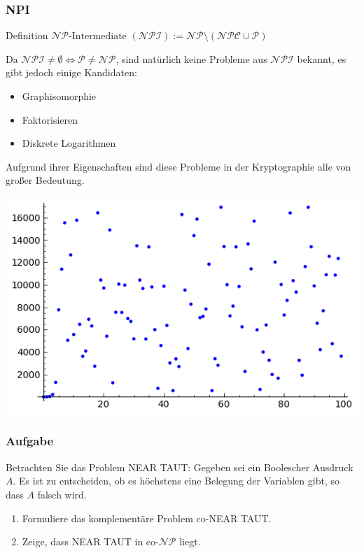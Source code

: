 \begin{frame}
\frametitle{NPI}
\begin{block}{Definition}
$\mathcal{NP}\text{-Intermediate } (\mathcal{NPI}) := \mathcal{NP} \setminus (\mathcal{NPC} \cup \mathcal{P})$
\end{block}
$$ $$ %
Da $\mathcal{NPI} \neq \emptyset \iff \mathcal{P} \neq \mathcal{NP}$, sind natürlich keine Probleme aus $\mathcal{NPI}$ bekannt, es gibt jedoch einige Kandidaten:
\begin{itemize}
	\item Graphisomorphie
	\item Faktorisieren
	\item Diskrete Logarithmen
\end{itemize}

Aufgrund ihrer Eigenschaften sind diese Probleme in der Kryptographie alle von großer Bedeutung.


\raggedleft \ducttape{-3cm} \includegraphics[scale=.33333]{images/dlog.png}
\end{frame}


\begin{frame}
\frametitle{Aufgabe}
Betrachten Sie das Problem NEAR TAUT: Gegeben sei ein Boolescher Ausdruck $A$. Es ist zu entscheiden, ob es höchstens eine Belegung der Variablen gibt, so dass $A$ falsch wird.
\begin{enumerate}
 \item Formuliere das komplementäre Problem co-NEAR TAUT.
 \item Zeige, dass NEAR TAUT in co-$\mathcal{NP}$ liegt.
\end{enumerate}
\end{frame}

